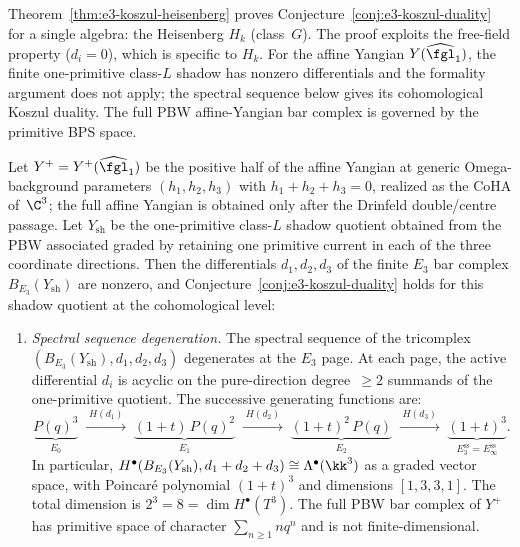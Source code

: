 \begin{remark}
\label{rem:e3-koszul-heisenberg-scope}
Theorem~\ref{thm:e3-koszul-heisenberg} proves Conjecture~\ref{conj:e3-koszul-duality} for a single algebra: the Heisenberg $H_k$ (class~$G$). The proof exploits the free-field property ($d_i = 0$), which is specific to $H_k$. For the affine Yangian \(Y(\widehat{\fgl}_1)\), the finite one-primitive class-\(L\) shadow has nonzero differentials and the formality argument does not apply; the spectral sequence below gives its cohomological Koszul duality. The full PBW affine-Yangian bar complex is governed by the primitive BPS space.
\end{remark}

\begin{theorem}
\label{thm:e3-koszul-yangian}
Let $Y^{+}=Y^{+}(\widehat{\fgl}_1)$ be the positive half of the affine
Yangian at generic Omega-background parameters
$(h_1, h_2, h_3)$ with $h_1 + h_2 + h_3 = 0$, realized as
the CoHA of~$\C^3$; the full affine Yangian is obtained only after
the Drinfeld double/centre passage. Let \(Y_{\mathrm{sh}}\) be the
one-primitive class-\(L\) shadow quotient obtained from the PBW
associated graded by retaining one primitive current in each of the
three coordinate directions. Then the differentials
$d_1, d_2, d_3$ of the finite $E_3$ bar complex
$B_{E_3}(Y_{\mathrm{sh}})$ are nonzero, and
Conjecture~\ref{conj:e3-koszul-duality} holds for this shadow quotient
at the cohomological level:
\begin{enumerate}[label=\textup{(\roman*)}]
 \item \emph{Spectral sequence degeneration.} The spectral sequence of the tricomplex $(B_{E_3}(Y_{\mathrm{sh}}), d_1, d_2, d_3)$ degenerates at the $E_3$ page. At each page, the active differential $d_i$ is acyclic on the pure-direction degree~$\geq 2$ summands of the one-primitive quotient. The successive generating functions are:
 \[
 \underbrace{P(q)^3}_{E_0} \;\xrightarrow{\;H(d_1)\;}\;
 \underbrace{(1+t)\,P(q)^2}_{E_1} \;\xrightarrow{\;H(d_2)\;}\;
 \underbrace{(1+t)^2\,P(q)}_{E_2} \;\xrightarrow{\;H(d_3)\;}\;
 \underbrace{(1+t)^3}_{E^{\mathrm{ss}}_3 = E^{\mathrm{ss}}_\infty}.
 \]
 In particular, $H^\bullet(B_{E_3}(Y_{\mathrm{sh}}), d_1 + d_2 + d_3) \cong \Lambda^\bullet(\kk^3)$ as a graded vector space, with Poincar\'{e} polynomial $(1+t)^3$ and dimensions $[1, 3, 3, 1]$. The total dimension is $2^3 = 8 = \dim H^\bullet(T^3)$. The full PBW bar complex of \(Y^+\) has primitive space of character \(\sum_{n\geq1}nq^n\) and is not finite-dimensional.


\end{enumerate}
\end{theorem}
